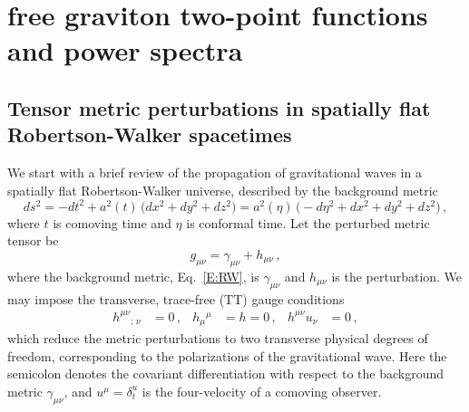 \documentclass[preprint,prd,showpacs,superscriptaddress]{revtex4}
\begin{document}
\section{free graviton two-point functions and power spectra}
\label{S:free-gravitons}
\subsection{Tensor metric perturbations in spatially flat Robertson-Walker spacetimes}

We start with a brief review of the propagation of gravitational waves in a spatially flat Robertson-Walker universe, 
described by the background metric
\begin{equation}\label{E:RW}
	ds^{2}= -dt^2 +a^2(t)\, \bigl(dx^{2}+dy^{2}+dz^{2}\bigr)
	=a^{2}(\eta)\,\bigl(-d\eta^{2}+dx^{2}+dy^{2}+dz^{2}\bigr)\,,
\end{equation}
where $t$ is comoving time and $\eta$ is conformal time. 
Let the perturbed metric tensor be
\begin{equation}
g_{\mu\nu} = \gamma_{\mu\nu} + h_{\mu\nu}\,,
\label{eq:h-def}
\end{equation}
where the background metric, Eq.~\eqref{E:RW}, is $\gamma_{\mu\nu} $ and $h_{\mu\nu}$ is the perturbation.
We  may impose the transverse, trace-free (TT) gauge conditions
\begin{align}\label{E:TT}
	h^{\mu\nu}{}_{;\,\nu}&=0\,,&h_{\mu}{}^{\mu}&=h=0\,,&h^{\mu\nu}u_{\nu}&=0\,,
\end{align}
which reduce the metric perturbations to two transverse physical degrees of freedom, corresponding to the polarizations of 
the gravitational wave. Here the semicolon denotes the covariant differentiation with respect to the background metric 
$\gamma_{\mu\nu}$, and $u^{\mu}=\delta^{u}_{t}$ is the four-velocity of a comoving observer.
\end{document}
